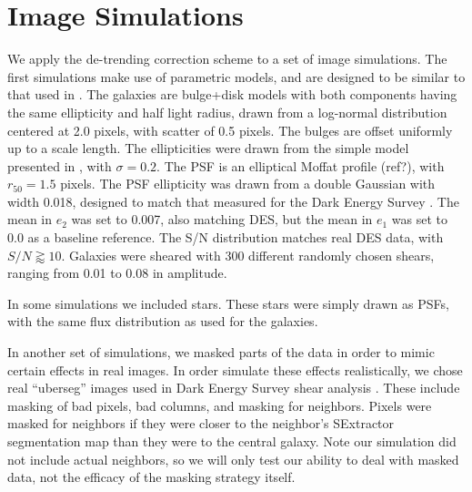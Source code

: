 \documentclass[usegraphicx,usenatbib]{mn2e}
\begin{document}
\section{Image Simulations}

We apply the de-trending correction scheme to a set of image simulations.  The
first simulations make use of parametric models, and are designed to be similar
to that used in \citet{bfd2015}.  The galaxies are bulge+disk models with both
components having the same ellipticity and half light radius, drawn from a
log-normal distribution centered at 2.0 pixels, with scatter of 0.5 pixels.
The bulges are offset uniformly up to a scale length.  The ellipticities were
drawn from the simple model presented in \cite{ba14}, with $\sigma=0.2$.  The
PSF is an elliptical Moffat profile (ref?), with $r_{50} = 1.5$ pixels. The PSF
ellipticity was drawn from a double Gaussian with width 0.018, designed to
match that measured for the Dark Energy Survey \citep{DESSVShear}. The mean in
$e_2$ was set to 0.007, also matching DES, but the mean in $e_1$ was set to 0.0
as a baseline reference.  The S/N distribution matches real DES data, with $S/N
\gtrapprox 10$.  Galaxies were sheared with 300 different randomly chosen
shears, ranging from 0.01 to 0.08 in amplitude.

In some simulations we included stars.  These stars were simply drawn
as PSFs, with the same flux distribution as used for the galaxies.

In another set of simulations, we masked parts of the data in order to mimic
certain effects in real images. In order simulate these effects realistically,
we chose real ``uberseg'' images used in Dark Energy Survey shear analysis
\citep{DESSVShear}.  These include masking of bad pixels, bad columns, and
masking for neighbors.  Pixels were masked for neighbors if they were closer to
the neighbor's SExtractor segmentation map than they were to the central
galaxy.  Note our simulation did not include actual neighbors, so we will only
test our ability to deal with masked data, not the efficacy of the masking
strategy itself.
\end{document}

